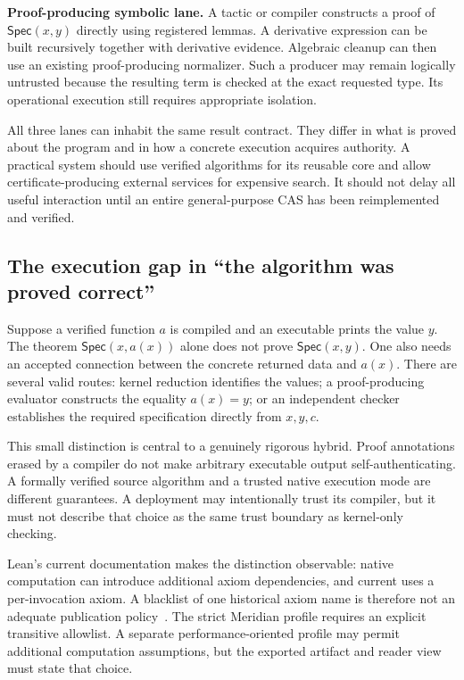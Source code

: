 \documentclass[11pt,a4paper]{article}
\newcommand{\code}[1]{\texttt{\detokenize{#1}}}
\newcommand{\Spec}{\mathsf{Spec}}
\theoremstyle{remark}
\begin{document}
\textbf{Proof-producing symbolic lane.} A tactic or compiler constructs a proof
of $\Spec(x,y)$ directly using registered lemmas. A derivative expression can be
built recursively together with derivative evidence. Algebraic cleanup can then
use an existing proof-producing normalizer. Such a producer may remain logically
untrusted because the resulting term is checked at the exact requested type.
Its operational execution still requires appropriate isolation.

All three lanes can inhabit the same result contract. They differ in what is
proved about the program and in how a concrete execution acquires authority.
A practical system should use verified algorithms for its reusable core and
allow certificate-producing external services for expensive search. It should
not delay all useful interaction until an entire general-purpose CAS has been
reimplemented and verified.

\subsection{The execution gap in ``the algorithm was proved correct''}
Suppose a verified function $a$ is compiled and an executable prints the value
$y$. The theorem $\Spec(x,a(x))$ alone does not prove $\Spec(x,y)$. One also needs
an accepted connection between the concrete returned data and $a(x)$.
There are several valid routes: kernel reduction identifies the values; a
proof-producing evaluator constructs the equality $a(x)=y$; or an independent
checker establishes the required specification directly from $x,y,c$.

This small distinction is central to a genuinely rigorous hybrid. Proof
annotations erased by a compiler do not make arbitrary executable output
self-authenticating. A formally verified source algorithm and a trusted native
execution mode are different guarantees. A deployment may intentionally trust
its compiler, but it must not describe that choice as the same trust boundary
as kernel-only checking.

Lean's current documentation makes the distinction observable: native computation
can introduce additional axiom dependencies, and current \code{native_decide}
uses a per-invocation axiom. A blacklist of one historical axiom name is therefore
not an adequate publication policy~\cite{leanaxioms}. The strict Meridian profile
requires an explicit transitive allowlist. A separate performance-oriented profile
may permit additional computation assumptions, but the exported artifact and
reader view must state that choice.
\end{document}
